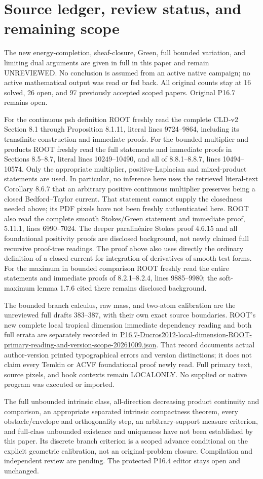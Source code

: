 \documentclass[11pt]{article}
\begin{document}
\section{Source ledger, review status, and remaining scope}
The new energy-completion, sheaf-closure, Green, full bounded variation,
and limiting dual arguments are given in full in this paper and remain
UNREVIEWED. No conclusion is assumed from an active native campaign;
no active mathematical output was read or fed back. All original
counts stay at 16 solved, 26 open, and 97 previously accepted scoped
papers. Original P16.7 remains open.

For the continuous psh definition ROOT freshly read the complete
CLD-v2 Section 8.1 through Proposition 8.1.11, literal lines
9724--9864, including its transfinite construction and immediate proofs.
For the bounded multiplier and products ROOT freshly read the full
statements and immediate proofs in Sections 8.5--8.7, literal lines
10249--10490, and all of 8.8.1--8.8.7, lines 10494--10574.
Only the appropriate multiplier, positive-Laplacian and mixed-product
statements are used. In particular, no inference here uses the
retrieved literal-text Corollary 8.6.7 that an arbitrary positive continuous
multiplier preserves being a closed Bedford--Taylor current.
That statement cannot supply the closedness needed above; its PDF
pixels have not been freshly authenticated here.
ROOT also read the complete smooth Stokes/Green statement and
immediate proof, 5.11.1, lines 6990--7024. The deeper paralin\'eaire
Stokes proof 4.6.15 and all foundational positivity proofs are disclosed
background, not newly claimed full recursive proof-tree readings.
The proof above also uses directly the ordinary definition of a
closed current for integration of derivatives of smooth test forms.
For the maximum in bounded comparison ROOT freshly read the entire
statements and immediate proofs of 8.2.1--8.2.4, lines 9885--9980;
the soft-maximum lemma 1.7.6 cited there remains disclosed background.

The bounded branch calculus, raw mass, and two-atom calibration are
the unreviewed full drafts 383--387, with their own exact source
boundaries. ROOT's new complete local tropical dimension immediate
dependency reading and both full errata are separately recorded in
\url{P16.7-Ducros2012-local-dimension-ROOT-primary-reading-and-version-scope-20261009.json}.
That record documents actual author-version printed typographical
errors and version distinctions; it does not claim every Temkin or
ACVF foundational proof newly read. Full primary text, source pixels,
and book contexts remain LOCALONLY. No supplied or native program
was executed or imported.

The full unbounded intrinsic class, all-direction decreasing product
continuity and comparison, an appropriate separated intrinsic
compactness theorem, every obstacle/envelope and orthogonality step,
an arbitrary-support measure criterion, and full-class unbounded
existence and uniqueness have not been established by this paper.
Its discrete branch criterion is a scoped advance conditional on the
explicit geometric calibration, not an original-problem closure.
Compilation and independent review are pending. The protected P16.4
editor stays open and unchanged.
\end{document}
